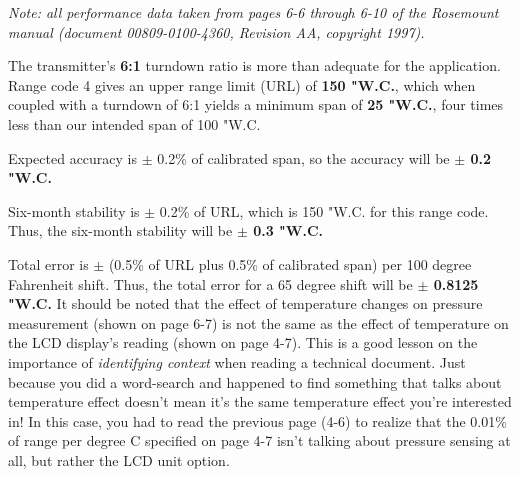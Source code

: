 





{\it Note: all performance data taken from pages 6-6 through 6-10 of the Rosemount manual (document 00809-0100-4360, Revision AA, copyright 1997).}

\vskip 10pt

The transmitter's {\bf 6:1} turndown ratio is more than adequate for the application.  Range code 4 gives an upper range limit (URL) of {\bf 150 "W.C.}, which when coupled with a turndown of 6:1 yields a minimum span of {\bf 25 "W.C.}, four times less than our intended span of 100 "W.C.

\vskip 10pt

Expected accuracy is $\pm$ 0.2\% of calibrated span, so the accuracy will be {\bf $\pm$ 0.2 "W.C.}

\vskip 10pt

Six-month stability is $\pm$ 0.2\% of URL, which is 150 "W.C. for this range code.  Thus, the six-month stability will be {\bf $\pm$ 0.3 "W.C.}

\vskip 10pt

Total error is $\pm$ (0.5\% of URL plus 0.5\% of calibrated span) per 100 degree Fahrenheit shift.  Thus, the total error for a 65 degree shift will be {\bf $\pm$ 0.8125 "W.C.}  It should be noted that the effect of temperature changes on pressure measurement (shown on page 6-7) is not the same as the effect of temperature on the LCD display's reading (shown on page 4-7).  This is a good lesson on the importance of {\it identifying context} when reading a technical document.  Just because you did a word-search and happened to find something that talks about temperature effect doesn't mean it's the same temperature effect you're interested in!  In this case, you had to read the previous page (4-6) to realize that the 0.01\% of range per degree C specified on page 4-7 isn't talking about pressure sensing at all, but rather the LCD unit option.




